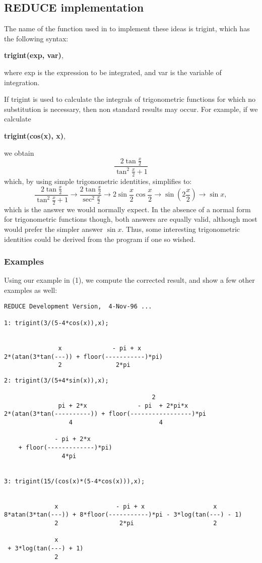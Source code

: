 \subsection{REDUCE implementation}
The name of the function used in \REDUCE to implement these ideas is trigint, which has the following syntax:
\begin{center}  \textbf{trigint(exp, var)}, \end{center}
where exp is the expression to be integrated, and var is the variable of integration.

If trigint is used to calculate the integrals of trigonometric functions for which no substitution is necessary, then non standard results may occur. For example, if we calculate
  \begin{center} \textbf{trigint(cos(x), x)}, \end{center}
we obtain
\[ \frac{2\tan\frac{x}{2}}{\tan^{2}\frac{x}{2}+1} \]
which, by using simple trigonometric identities, simplifies to:
\[ \frac{2\tan\frac{x}{2}}{\tan^{2}\frac{x}{2}+1} \rightarrow \frac{2\tan\frac{x}{2}}{\sec^{2}\frac{x}{2}} \rightarrow 2\sin\frac{x}{2}\cos\frac{x}{2} \rightarrow \sin \left(2\frac{x}{2}\right) \rightarrow \sin x, \]
which is the answer we would normally expect. In the absence of a
normal form for trigonometric functions though, both answers are
equally valid, although most would prefer the simpler answer $\sin
x$. Thus, some interesting trigonometric identities could be derived
from the program if one so wished.

\subsubsection{Examples}
Using our example in (1), we compute the corrected result, and show a few other examples as well:
\begin{verbatim}
REDUCE Development Version,  4-Nov-96 ...

1: trigint(3/(5-4*cos(x)),x);


               x              - pi + x
2*(atan(3*tan(---)) + floor(-----------)*pi)
               2               2*pi
\end{verbatim}

\begin{verbatim}
2: trigint(3/(5+4*sin(x)),x);

                                         2
               pi + 2*x              - pi  + 2*pi*x
2*(atan(3*tan(----------)) + floor(-----------------)*pi
                  4                        4

              - pi + 2*x
    + floor(-------------)*pi)
                4*pi


3: trigint(15/(cos(x)*(5-4*cos(x))),x);


              x                - pi + x                   x
8*atan(3*tan(---)) + 8*floor(-----------)*pi - 3*log(tan(---) - 1)
              2                 2*pi                      2

              x
 + 3*log(tan(---) + 1)
              2
\end{verbatim}

